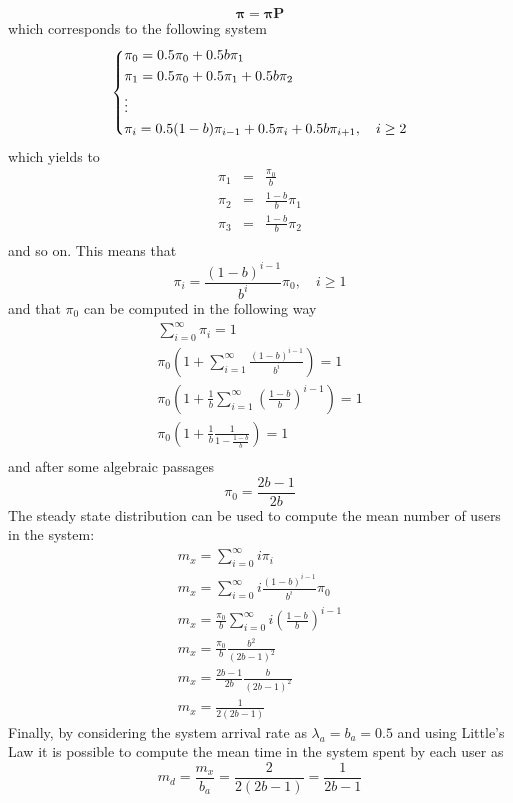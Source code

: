 \documentclass[10pt]{article}
\begin{document}
\begin{equation}
	\boldsymbol{\pi} = \boldsymbol{\pi} \mathbf{P}
\end{equation}
which corresponds to the following system
\begin{equation}
\begin{dcases}
	\pi_0 = 0.5 \pi_0 + 0.5b \pi_1	\\
	\pi_1 = 0.5 \pi_0 + 0.5 \pi_1 + 0.5 b \pi_2	\\
	\vdots	\\
	\pi_i = 0.5(1-b) \pi_{i-1} + 0.5 \pi_i + 0.5b\pi_{i+1}, \quad i \ge 2	\\
\end{dcases}
\end{equation}
which yields to
\begin{eqnarray}
	\pi_1 & = & \frac{\pi_0}{b} \\
	\pi_2 & = & \frac{1-b}{b} \pi_1 \\
	\pi_3 & = & \frac{1-b}{b} \pi_2 \\
\end{eqnarray}
and so on. This means that
\begin{equation}
	\pi_i = \frac{(1-b)^{i-1}}{b^i} \pi_0, \quad i \ge 1
\end{equation} 
and that $\pi_0$ can be computed in the following way
\begin{eqnarray*}
	\sum_{i = 0}^{\infty} \pi_i = 1 \\
	\pi_0 \left( 1 + \sum_{i = 1}^{\infty} \frac{(1-b)^{i-1}}{b^i} \right) = 1 \\
	\pi_0 \left( 1 + \frac{1}{b}\sum_{i = 1}^{\infty} \left(\frac{1-b}{b}\right)^{i-1} \right) = 1 \\
	\pi_0 \left( 1 + \frac{1}{b} \frac{1}{1-\frac{1-b}{b}} \right) = 1 \\
\end{eqnarray*}
and after some algebraic passages 
\begin{equation}
	\pi_0 = \frac{2b -1}{2b}
\end{equation}
The steady state distribution can be used to compute the mean number of users in the system:
\begin{align*}
	m_x = \sum_{i = 0}^{\infty} i \pi_i \\
	m_x = \sum_{i = 0}^{\infty} i \frac{(1-b)^{i-1}}{b^i} \pi_0 \\
	m_x = \frac{\pi_0}{b} \sum_{i = 0}^{\infty} i \left( \frac{1-b}{b} \right)^{i-1} \\
	m_x = \frac{\pi_0}{b} \frac{b^2}{(2b -1)^2} \\
	m_x = \frac{2b -1}{2b} \frac{b}{(2b -1)^2} \\
	m_x = \frac{1}{2(2b-1)}
\end{align*}
Finally, by considering the system arrival rate as $\lambda_a = b_a = 0.5$ and using Little's Law it is possible to compute the mean time in the system spent by each user as
\begin{equation}
	m_d = \frac{m_x}{b_a} = \frac{2}{2(2b-1)} = \frac{1}{2b-1}
\end{equation}
\end{document}

